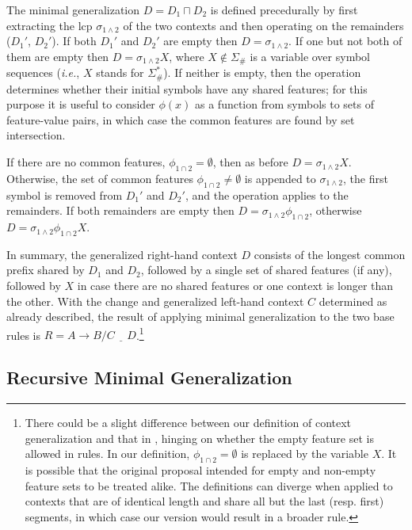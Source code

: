 \documentclass[11pt]{article}
\begin{document}
The minimal generalization $D = D_1 \sqcap D_2$ is defined precedurally by first extracting the lcp $\sigma_{1\land2}$ of the two contexts and then operating on the remainders ($D_1'$, $D_2'$). If both $D_1'$ and $D_2'$ are empty then $D = \sigma_{1\land2}$. If one but not both of them are empty then $D = \sigma_{1\land2}X$, where $X \notin \Sigma_{\#}$ is a variable over symbol sequences (\emph{i.e.}, $X$ stands for $\Sigma_{\#}^*$). If neither is empty, then the operation determines whether their initial symbols have any shared features; for this purpose it is useful to consider $\phi(x)$ as a function from symbols to sets of feature-value pairs, in which case the common features are found by set intersection.

If there are no common features, $\phi_{1\cap2} = \emptyset$, then as before $D = \sigma_{1\land2}X$. Otherwise, the set of common features $\phi_{1\cap2} \neq \emptyset$ is appended to $\sigma_{1\land2}$, the first symbol is removed from $D_1'$ and $D_2'$, and the operation applies to the remainders. If both remainders are empty then $D = \sigma_{1\land2} \phi_{1\cap2}$, otherwise $D = \sigma_{1\land2}\phi_{1\cap2}X$.

In summary, the generalized right-hand context $D$ consists of the longest common prefix shared by $D_1$ and $D_2$, followed by a single set of shared features (if any), followed by $X$ in case there are no shared features or one context is longer than the other. With the change and generalized left-hand context $C$ determined as already described, the result of applying minimal generalization to the two base rules is $R = A \to B / C \ \underline{\ \ \ } \ D$.\footnote{There could be a slight difference between our definition of context generalization and that in \citet{albright-hayes-2002-modeling}, hinging on whether the empty feature set is allowed in rules. In our definition, $\phi_{1\cap2} = \emptyset$ is replaced by the variable $X$. It is possible that the original proposal intended for empty and non-empty feature sets to be treated alike. The definitions can diverge when applied to contexts that are of identical length and share all but the last (resp. first) segments, in which case our version would result in a broader rule.}

\subsection{Recursive Minimal Generalization}
\end{document}
